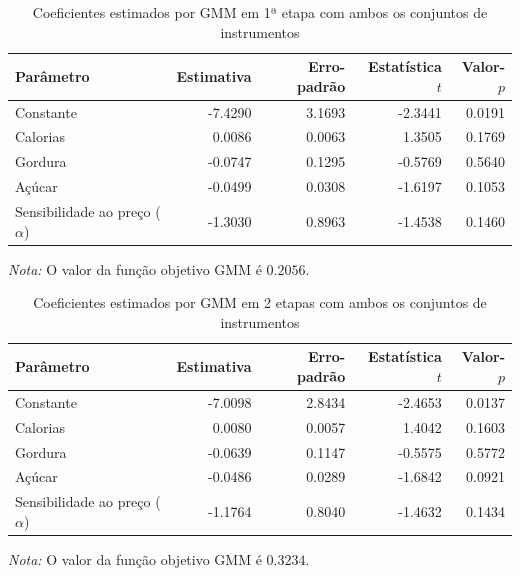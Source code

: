 
\begingroup
\begin{table}[H]
\centering
\caption{Coeficientes estimados por GMM em 1ª etapa com ambos os conjuntos de instrumentos}
\label{tab:coef-gmm1-ambos-instrumentos}
\small
\begin{tabular}{lrrrr}
\toprule
Parâmetro & Estimativa & Erro-padrão & Estatística $t$ & Valor-$p$ \\
\midrule
Constante & -7.4290 & 3.1693 & -2.3441 & 0.0191 \\
Calorias & 0.0086 & 0.0063 & 1.3505 & 0.1769 \\
Gordura & -0.0747 & 0.1295 & -0.5769 & 0.5640 \\
Açúcar & -0.0499 & 0.0308 & -1.6197 & 0.1053 \\
Sensibilidade ao preço ($\alpha$) & -1.3030 & 0.8963 & -1.4538 & 0.1460 \\
\bottomrule
\end{tabular}

\vspace{0.3em}
\footnotesize
\textit{Nota:} O valor da função objetivo GMM é $0.2056$.
\end{table}
\endgroup


\begingroup
\begin{table}[H]
\centering
\caption{Coeficientes estimados por GMM em 2 etapas com ambos os conjuntos de instrumentos}
\label{tab:coef-gmm2-ambos-instrumentos}
\small
\begin{tabular}{lrrrr}
\toprule
Parâmetro & Estimativa & Erro-padrão & Estatística $t$ & Valor-$p$ \\
\midrule
Constante & -7.0098 & 2.8434 & -2.4653 & 0.0137 \\
Calorias & 0.0080 & 0.0057 & 1.4042 & 0.1603 \\
Gordura & -0.0639 & 0.1147 & -0.5575 & 0.5772 \\
Açúcar & -0.0486 & 0.0289 & -1.6842 & 0.0921 \\
Sensibilidade ao preço ($\alpha$) & -1.1764 & 0.8040 & -1.4632 & 0.1434 \\
\bottomrule
\end{tabular}

\vspace{0.3em}
\footnotesize
\textit{Nota:} O valor da função objetivo GMM é $0.3234$.
\end{table}
\endgroup

